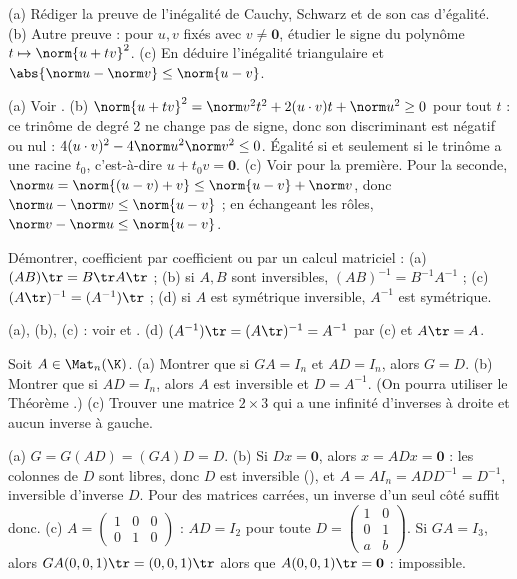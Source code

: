 \begin{exo}
(a) Rédiger la preuve de l'inégalité de Cauchy, Schwarz et de son cas d'égalité.
(b) Autre preuve : pour $u,v$ fixés avec $v\neq\mathbf 0$, étudier le signe du polynôme $t\mapsto\norm{u+tv}^2$.
(c) En déduire l'inégalité triangulaire et $\abs{\norm u-\norm v}\le\norm{u-v}$.
\begin{corrige}
(a) Voir .
(b) $\norm{u+tv}^2=\norm v^2t^2+2(u\cdot v)t+\norm u^2\ge0$ pour tout $t$ : ce trinôme de degré $2$ ne change pas de signe, donc son discriminant est négatif ou nul : $4(u\cdot v)^2-4\norm u^2\norm v^2\le0$. Égalité si et seulement si le trinôme a une racine $t_0$, c'est-à-dire $u+t_0v=\mathbf 0$.
(c) Voir  pour la première. Pour la seconde, $\norm u=\norm{(u-v)+v}\le\norm{u-v}+\norm v$, donc $\norm u-\norm v\le\norm{u-v}$ ; en échangeant les rôles, $\norm v-\norm u\le\norm{u-v}$.
\end{corrige}
\end{exo}
\begin{exo}
Démontrer, coefficient par coefficient ou par un calcul matriciel : (a) $(AB)\tr=B\tr A\tr$ ; (b) si $A,B$ sont inversibles, $(AB)^{-1}=B^{-1}A^{-1}$ ; (c) $(A\tr)^{-1}=(A^{-1})\tr$ ; (d) si $A$ est symétrique inversible, $A^{-1}$ est symétrique.
\begin{corrige}
(a), (b), (c) : voir  et . (d) $(A^{-1})\tr=(A\tr)^{-1}=A^{-1}$ par (c) et $A\tr=A$.
\end{corrige}
\end{exo}
\begin{exo}
Soit $A\in\Mat_n(\K)$. (a) Montrer que si $GA=I_n$ et $AD=I_n$, alors $G=D$. (b) Montrer que si $AD=I_n$, alors $A$ est inversible et $D=A^{-1}$. (On pourra utiliser le Théorème .) (c) Trouver une matrice $2\times3$ qui a une infinité d'inverses à droite et aucun inverse à gauche.
\begin{corrige}
(a) $G=G(AD)=(GA)D=D$. (b) Si $Dx=\mathbf 0$, alors $x=ADx=\mathbf 0$ : les colonnes de $D$ sont libres, donc $D$ est inversible (), et $A=AI_n=ADD^{-1}=D^{-1}$, inversible d'inverse $D$. Pour des matrices carrées, un inverse d'un seul côté suffit donc. (c) $A=\begin{pmatrix}1&0&0\\0&1&0\end{pmatrix}$ : $AD=I_2$ pour toute $D=\begin{pmatrix}1&0\\0&1\\a&b\end{pmatrix}$. Si $GA=I_3$, alors $GA(0,0,1)\tr=(0,0,1)\tr$ alors que $A(0,0,1)\tr=\mathbf 0$ : impossible.
\end{corrige}
\end{exo}
